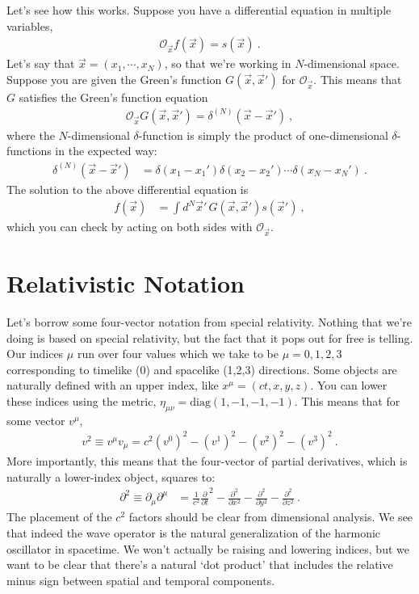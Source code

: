 Let's see how this works. Suppose you have a differential equation in multiple variables,
\begin{align}
  \mathcal O_{\vec{x}} f(\vec{x}) = s(\vec{x}) \ .
\end{align}
Let's say that $\vec{x}=(x_1, \cdots, x_N)$, so that we're working in $N$-dimensional space. Suppose you are given the Green's function $G(\vec{x},\vec{x}')$ for $\mathcal O_{\vec{x}}$. This means that $G$ satisfies the Green's function equation
\begin{align}
  \mathcal O_{\vec{x}} G(\vec{x},\vec{x}') = \delta^{(N)}(\vec{x}-\vec{x}') \ ,
\end{align}
where the $N$-dimensional $\delta$-function is simply the product of one-dimensional $\delta$-functions in the expected way:
\begin{align}
  \delta^{(N)}(\vec{x}-\vec{x}') 
  &=
  \delta(x_1-x_1')\delta(x_2-x_2')\cdots\delta(x_N-x_N') \ .
\end{align}
The solution to the above differential equation is
\begin{align}
  f(\vec{x}) &= \int d^N\vec{x}'\,  G(\vec{x},\vec{x}') s(\vec{x}') \ ,
\end{align}
which you can check by acting on both sides with $\mathcal O_{\vec{x}}$.




\section{Relativistic Notation}

Let's borrow some four-vector notation from special relativity. Nothing that we're doing is based on special relativity, but the fact that it pops out for free is telling. Our indices $\mu$ run over four values which we take to be $\mu = 0,1,2,3$ corresponding to timelike (0) and spacelike (1,2,3) directions. Some objects are naturally defined with an upper index, like $x^\mu = (ct,x,y,z)$. You can lower these indices using the metric, $\eta_{\mu\nu}=\text{diag}(1,-1,-1,-1)$. This means that for some vector $v^\mu$,
\begin{align}
  v^2 \equiv v^\mu v_\mu 
  = c^2(v^0)^2 - (v^1)^2 - (v^2)^2 - (v^3)^2 \ .
 \end{align}
 More importantly, this means that the four-vector of partial derivatives, which is naturally a lower-index object, squares to:
 \begin{align}
   \partial^2\equiv
  \partial_\mu \partial^\mu 
  &= 
  \frac{1}{c^2}
      \frac{\partial}{\partial t}^2
      -
      \frac{\partial^2}
      {\partial x^2}
      -
      \frac{\partial^2}
      {\partial y^2}
      -
      \frac{\partial^2}
      {\partial z^2} \ .
 \end{align}
The placement of the $c^2$ factors should be clear from dimensional analysis. We see that indeed the wave operator is the natural generalization of the harmonic oscillator in spacetime. We won't actually be raising and lowering indices, but we want to be clear that there's a natural `dot product' that includes the relative minus sign between spatial and temporal components.


